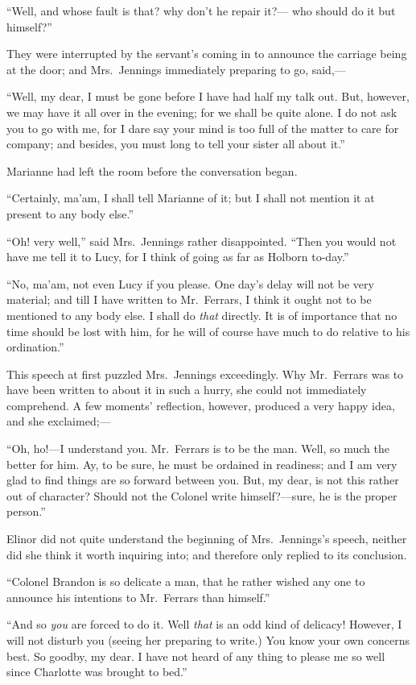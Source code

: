 ``Well, and whose fault is that? why don't he repair it?---%
who should do it but himself?''

They were interrupted by the servant's coming in to
announce the carriage being at the door; and Mrs.\ Jennings
immediately preparing to go, said,---%

``Well, my dear, I must be gone before I have had half
my talk out.  But, however, we may have it all over in
the evening; for we shall be quite alone.  I do not ask
you to go with me, for I dare say your mind is too full
of the matter to care for company; and besides, you must
long to tell your sister all about it.''

Marianne had left the room before the conversation began.

``Certainly, ma'am, I shall tell Marianne of it;
but I shall not mention it at present to any body else.''

``Oh! very well,'' said Mrs.\ Jennings rather disappointed.
``Then you would not have me tell it to Lucy, for I think
of going as far as Holborn to-day.''

``No, ma'am, not even Lucy if you please.
One day's delay will not be very material; and till I
have written to Mr.\ Ferrars, I think it ought not to be
mentioned to any body else.  I shall do \emph{that} directly.
It is of importance that no time should be lost with him,
for he will of course have much to do relative to
his ordination.''

This speech at first puzzled Mrs.\ Jennings exceedingly.
Why Mr.\ Ferrars was to have been written to about it
in such a hurry, she could not immediately comprehend.
A few moments' reflection, however, produced a very happy idea,
and she exclaimed;---%

``Oh, ho!---I understand you.  Mr.\ Ferrars is to be
the man.  Well, so much the better for him.  Ay, to be sure,
he must be ordained in readiness; and I am very glad
to find things are so forward between you.  But, my dear,
is not this rather out of character?  Should not the Colonel
write himself?---sure, he is the proper person.''

Elinor did not quite understand the beginning of
Mrs.\ Jennings's speech, neither did she think it worth
inquiring into; and therefore only replied to its conclusion.

``Colonel Brandon is so delicate a man, that he rather
wished any one to announce his intentions to Mr.\ Ferrars
than himself.''

``And so \emph{you} are forced to do it.  Well \emph{that} is an odd
kind of delicacy!  However, I will not disturb you (seeing
her preparing to write.)  You know your own concerns best.
So goodby, my dear.  I have not heard of any thing to
please me so well since Charlotte was brought to bed.''

